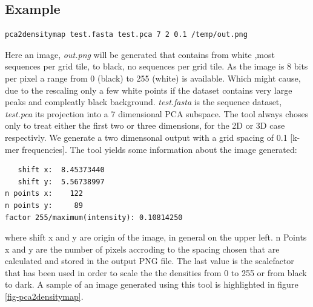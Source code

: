 \subsection{Example}
\begin{lstlisting}
pca2densitymap test.fasta test.pca 7 2 0.1 /temp/out.png
\end{lstlisting}
Here an image, \emph{out.png} will be generated that contains from
white ,most sequences per grid tile, to black, no sequences per grid
tile. As the image is 8 bits per pixel a range from 0 (black) to 255
(white) is available. Which might cause, due to the rescaling only a
few white points if the dataset contains very large peaks and
compleatly black background. \emph{test.fasta} is the sequence
dataset, \emph{test.pca} its projection into a 7 dimensional PCA
subspace. The tool always choses only to treat either the first two or
three dimensions, for the 2D or 3D case respectivly.
We generate a two dimensonal output with a grid spacing of
0.1 [k-mer frequencies]. The tool yields some information about
the image generated:
\begin{lstlisting}
   shift x:  8.45373440
   shift y:  5.56738997
n points x:    122
n points y:     89
factor 255/maximum(intensity): 0.10814250
\end{lstlisting}
where shift x and y are origin of the image, in general on the upper
left. n Points x and y are the number of pixels accroding to the
spacing chosen that are calculated and stored in the output PNG
file. The last value is the scalefactor that has been used in order to
scale the the densities from 0 to 255 or from black to dark. A sample
of an image generated using this tool is highlighted in figure
\ref{fig-pca2densitymap}.
